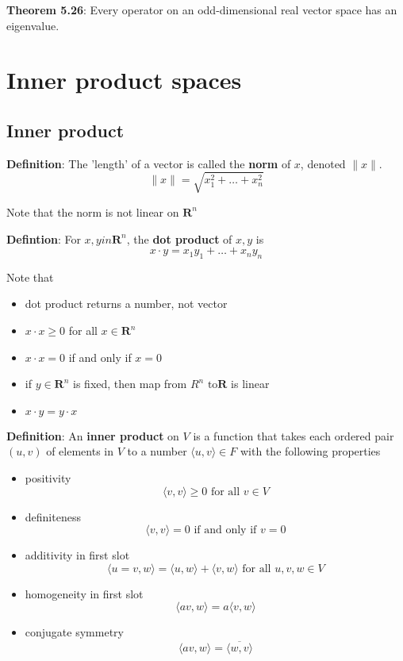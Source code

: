 \documentclass[a4paper, 10pt]{report}
\begin{document}
\begin{framed}
   \textbf{Theorem 5.26}: Every operator on an odd-dimensional real vector space has an eigenvalue. 
\end{framed}

\chapter{Inner product spaces}
\section{Inner product}
\begin{framed}
   \textbf{Definition}: The 'length' of a vector is called the \textbf{norm} of $x$, denoted $ \lVert x \rVert $. 
   \[
     \lVert x \rVert  = \sqrt{x_1^2 + \hdots + x_n^2}
   \] 
\end{framed}

Note that the norm is not linear on $\textbf{R}^n$

\begin{framed}
   \textbf{Defintion}: For $x, y in \textbf{R}^n$, the \textbf{dot product } of $x, y $ is
   \[
     x \cdot y = x_1y_1 + \hdots + x_n y_n
   \] 
\end{framed}

Note that
\begin{itemize}
   \item dot product returns a number, not vector
   \item $x \cdot x \geq 0$  for all  $x \in \textbf{R}^n$
   \item $x \cdot x = 0$ if and only if  $x = 0$ \\
   \item if $y \in \textbf{R}^n$ is fixed, then map from $R^n \text{ to} \textbf{R}$  is linear
   \item $x \cdot y = y \cdot x$
\end{itemize}

\begin{framed}
   \textbf{Definition}: An \textbf{inner product } on $V$ is a function that takes each ordered pair $(u, v)$ of elements in $V$ to a number $ \langle u, v\rangle \in F$ with the following properties
   \begin{itemize}
      \item positivity
         \[
            \langle v, v \rangle \geq 0 \text{ for all $v \in V$}
         \] 
      \item definiteness
         \[
            \langle v, v \rangle = 0 \text{ if and only if $v = 0$}
         \] 
      \item additivity in first slot
         \[
            \langle u = v, w \rangle = \langle u, w \rangle + \langle v, w \rangle \text{ for all } u, v, w \in V
         \] 
      \item homogeneity in first slot
         \[
            \langle av, w \rangle = a \langle v, w \rangle
         \] 
      \item conjugate symmetry
         \[
            \langle av, w \rangle = \overline{ \langle w, v\rangle}
         \] 
   \end{itemize}
\end{framed}
\end{document}
